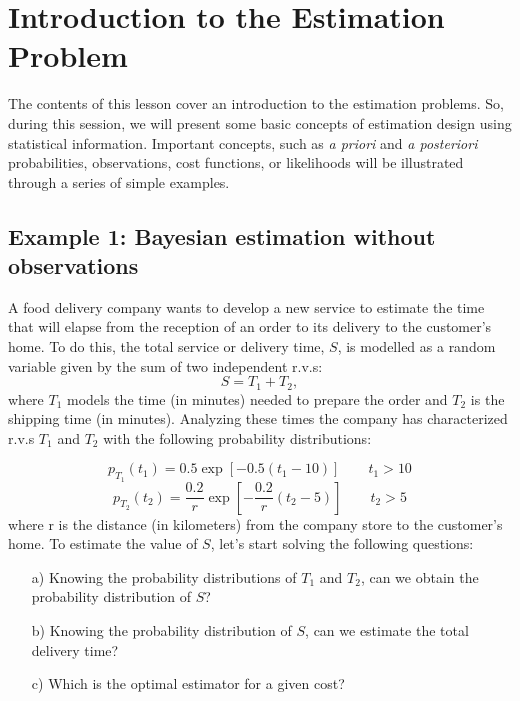 \section{Introduction to the Estimation Problem}
\label{sec:M2}

The contents of this lesson cover an introduction to the estimation problems. So, during this session, we will present some basic concepts of estimation design using statistical information. Important concepts, such as {\em a priori} and {\em a posteriori} probabilities, observations, cost functions, or likelihoods will be illustrated through a series of simple examples.

\subsection{Example 1: Bayesian estimation without observations}
\label{subsec:example1}

\begin{problem} 
A food delivery company wants to develop a new service to estimate the time that will elapse from the reception of an order to its delivery to the customer's home.
To do this, the total service or delivery time, $S$, is modelled as a random variable given by the sum of two independent r.v.s:
$$S=T_1 + T_2,$$
where $T_1$ models the time (in minutes) needed to prepare the order and $T_2$ is the shipping time (in minutes).
Analyzing these times the company has characterized r.v.s $T_1$ and $T_2$ with the following probability distributions:

$$p_{T_1}(t_1) = 0.5 \exp{\left[-0.5(t_1 - 10) \right]} \quad \quad  t_1 >10 $$
$$p_{T_2}(t_2) = \frac{0.2}{r} \exp{\left[-\frac{0.2}{r} (t_2-5)\right]} \quad \quad  t_2 >5 $$
where r is the distance (in kilometers) from the company store to the customer's home. 
To estimate the value of $S$, let's start solving the following questions:
    \begin{itemize}
        \item[a)] Knowing the probability distributions of $T_1$ and $T_2$, can we obtain the probability distribution of $S$?
        \item[b)] Knowing the probability distribution of $S$, can we estimate the total delivery time? 
        \item[c)] Which is the optimal estimator for a given cost? 
    \end{itemize}
\end{problem}


